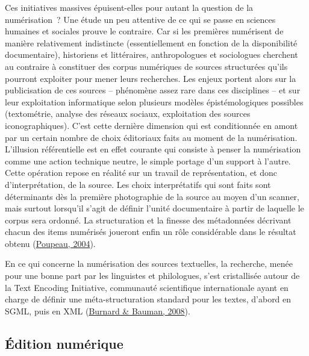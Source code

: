 \documentclass[12pt,french,letterpaper,]{article}
\begin{document}
Ces initiatives massives épuisent-elles pour autant la question de la
numérisation~? Une étude un peu attentive de ce qui se passe en sciences
humaines et sociales prouve le contraire. Car si les premières
numérisent de manière relativement indistincte (essentiellement en
fonction de la disponibilité documentaire), historiens et littéraires,
anthropologues et sociologues cherchent au contraire à constituer des
corpus numériques de sources structurées qu'ils pourront exploiter pour
mener leurs recherches. Les enjeux portent alors sur la publicisation de
ces sources -- phénomène assez rare dans ces disciplines -- et sur leur
exploitation informatique selon plusieurs modèles épistémologiques
possibles (textométrie, analyse des réseaux sociaux, exploitation des
sources iconographiques). C'est cette dernière dimension qui est
conditionnée en amont par un certain nombre de choix éditoriaux faits au
moment de la numérisation. L'illusion référentielle est en effet
courante qui consiste à penser la numérisation comme une action
technique neutre, le simple portage d'un support à l'autre. Cette
opération repose en réalité sur un travail de représentation, et donc
d'interprétation, de la source. Les choix interprétatifs qui sont faits
sont déterminants dès la première photographie de la source au moyen
d'un scanner, mais surtout lorsqu'il s'agit de définir l'unité
documentaire à partir de laquelle le corpus sera ordonné. La
structuration et la finesse des métadonnées décrivant chacun des items
numérisés joueront enfin un rôle considérable dans le résultat obtenu
(\protect\hyperlink{ref-poupeau_ledition_2004}{Poupeau, 2004}).

En ce qui concerne la numérisation des sources textuelles, la recherche,
menée pour une bonne part par les linguistes et philologues, s'est
cristallisée autour de la Text Encoding Initiative, communauté
scientifique internationale ayant en charge de définir une
méta-structuration standard pour les textes, d'abord en SGML, puis en
XML (\protect\hyperlink{ref-burnard_tei_2008}{Burnard \& Bauman, 2008}).

\hypertarget{uxe9dition-numuxe9rique}{%
\subsection{Édition numérique}\label{uxe9dition-numuxe9rique}}
\end{document}
